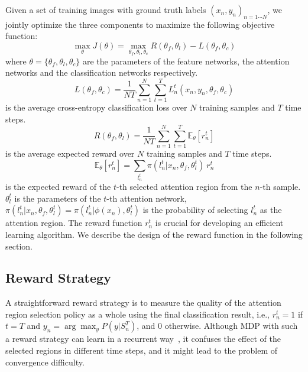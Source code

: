 \documentclass[10pt,twocolumn,letterpaper]{article}
\begin{document}
Given a set of training images with ground truth labels $(x_n, y_n)_{n=1\cdots N}$, we jointly optimize the three components to maximize the following objective function:
\begin{equation}
\max_{\theta} J(\theta) =  \max_{\theta_f, \theta_l, \theta_c} R(\theta_f, \theta_l) - L(\theta_f, \theta_c)
\end{equation}
where $\theta = \{\theta_f, \theta_l, \theta_c\}$ are the parameters of the feature networks, the attention networks and the classification networks respectively.
\begin{equation}
L(\theta_f, \theta_c) = \frac{1}{NT} \sum_{n=1}^N \sum_{t=1}^T L^t_n(x_n, y_n, \theta_f, \theta_c)
\end{equation}
is the average cross-entropy classification loss over $N$ training samples and $T$ time steps.
\begin{equation}
R(\theta_f, \theta_l) = \frac{1}{NT} \sum_{n=1}^N \sum_{t=1}^T \mathbb{E}_{\theta}[r^t_n]
\end{equation}
is the average expected reward over $N$ training samples and $T$ time steps.
\begin{equation}
\mathbb{E}_{\theta}[r^t_n] = \sum_{l^t_n} \pi(l^t_n|x_n, \theta_f, \theta^t_l) \ r^t_n
\end{equation}
is the expected reward of the $t$-th selected attention region from the $n$-th sample.
$\theta^t_l$ is the parameters of the $t$-th attention network,
$\pi(l^t_n|x_n, \theta_f, \theta^t_l) = \pi(l^t_n|\phi(x_n), \theta^t_l)$ is the probability of selecting $l^t_n$ as the attention region.
The reward function $r^t_n$ is crucial for developing an efficient learning algorithm. We describe the design of the reward function in the following section.

\subsection{Reward Strategy} \label{sec: reward}

A straightforward reward strategy is to measure the quality of the attention region selection policy as a whole using the final classification result, i.e., $r^t_n = 1$ if $t=T$ and $y_n=\arg\max_y P(y | S^T_n)$, and 0 otherwise.
Although MDP with such a reward strategy can learn in a recurrent way~\cite{mnih2014recurrent}, it confuses the effect of the selected regions in different time steps,
and it might lead to the problem of convergence difficulty.
\end{document}
